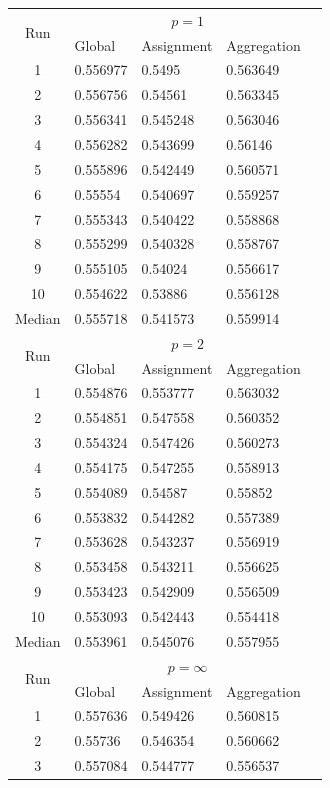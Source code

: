 \begin{table}[ht]
\begin{tabular}{cllll}
		\toprule
		\multirow{2}{*}{Run} & \multicolumn{3}{c}{ $p = 1$} \\
		\cmidrule{2-4} & Global & Assignment & Aggregation \\
		\midrule		
		1 & 0.556977 & 0.5495 & 0.563649 \\
		2 & 0.556756 & 0.54561 & 0.563345 \\
		3 & 0.556341 & 0.545248 & 0.563046 \\ 
		4 & 0.556282 & 0.543699 & 0.56146 \\
		5 & 0.555896 & 0.542449 & 0.560571\\
		6 & 0.55554 & 0.540697 & 0.559257\\
		7 & 0.555343 & 0.540422 & 0.558868\\
		8 & 0.555299 & 0.540328 & 0.558767\\
		9 & 0.555105 & 0.54024 & 0.556617\\
		10 &  0.554622 & 0.53886 &	0.556128\\
		Median & 0.555718 & 0.541573 & 0.559914 \\
		\midrule
		\multirow{2}{*}{Run} & \multicolumn{3}{c}{ $p=2$} \\
		\cmidrule{2-4} & Global & Assignment & Aggregation \\
		\midrule
			1 & 0.554876 & 0.553777 & 0.563032	\\
			2 & 0.554851 & 0.547558 & 0.560352 \\
			3 & 0.554324 & 0.547426 & 0.560273 \\ 
			4 & 0.554175 & 0.547255 & 0.558913\\
			5 & 0.554089 & 0.54587 & 0.55852\\
			6 & 0.553832 & 0.544282 & 0.557389\\
			7 & 0.553628 & 0.543237 & 0.556919\\
			8 & 0.553458 & 0.543211 & 0.556625\\
			9 & 0.553423 & 0.542909 & 0.556509\\
			10 & 0.553093 & 0.542443 & 0.554418\\
			Median &0.553961 & 0.545076 & 0.557955 \\
			\midrule
			\multirow{2}{*}{Run} & \multicolumn{3}{c}{ $p=\infty$} \\
			\cmidrule{2-4} & Global & Assignment & Aggregation \\
			\midrule
			1 & 0.557636 & 0.549426 & 0.560815	 \\
			2 &	0.55736 & 0.546354 & 0.560662 \\
			3 &	0.557084 & 0.544777 & 0.556537 \\ 

\end{tabular}
\end{table}

